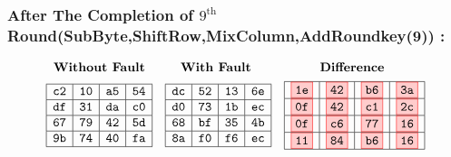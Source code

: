\subsubsection{After The Completion of $9^{\text{th}}$ Round(SubByte,ShiftRow,MixColumn,AddRoundkey(9)) :}
\[
\begin{array}{ccc}
\textbf{Without Fault} & \textbf{With Fault } & \textbf{Difference } \\[1ex]
\begin{array}{|c|c|c|c|}
    \hline
    \texttt{c2} & \texttt{10} & \texttt{a5} & \texttt{54} \\
    \hline
    \texttt{df} & \texttt{31} & \texttt{da} & \texttt{c0} \\
    \hline
    \texttt{67} & \texttt{79} & \texttt{42} & \texttt{5d} \\
    \hline
    \texttt{9b} & \texttt{74} & \texttt{40} & \texttt{fa} \\
    \hline
\end{array} 
&

\begin{array}{|c|c|c|c|}
    \hline
    \texttt{dc} & \texttt{52} & \texttt{13} & \texttt{6e} \\
    \hline
    \texttt{d0} & \texttt{73} & \texttt{1b} & \texttt{ec} \\
    \hline
    \texttt{68} & \texttt{bf} & \texttt{35} & \texttt{4b} \\
    \hline
    \texttt{8a} & \texttt{f0} & \texttt{f6} & \texttt{ec} \\
    \hline
    \end{array}

    &

    \begin{array}{|c|c|c|c|}
        \hline
        \fcolorbox{red}{red!20}{\texttt{1e}} & \fcolorbox{red}{red!20}{\texttt{42}} & \fcolorbox{red}{red!20}{\texttt{b6}} & \fcolorbox{red}{red!20}{\texttt{3a}} \\
        \hline
        \fcolorbox{red}{red!20}{\texttt{0f}} & \fcolorbox{red}{red!20}{\texttt{42}} & \fcolorbox{red}{red!20}{\texttt{c1}} & \fcolorbox{red}{red!20}{\texttt{2c}} \\
        \hline
        \fcolorbox{red}{red!20}{\texttt{0f}} & \fcolorbox{red}{red!20}{\texttt{c6}} & \fcolorbox{red}{red!20}{\texttt{77}} & \fcolorbox{red}{red!20}{\texttt{16}} \\
        \hline
        \fcolorbox{red}{red!20}{\texttt{11}} & \fcolorbox{red}{red!20}{\texttt{84}} & \fcolorbox{red}{red!20}{\texttt{b6}} & \fcolorbox{red}{red!20}{\texttt{16}} \\
        \hline
    \end{array}
\end{array}
\]
